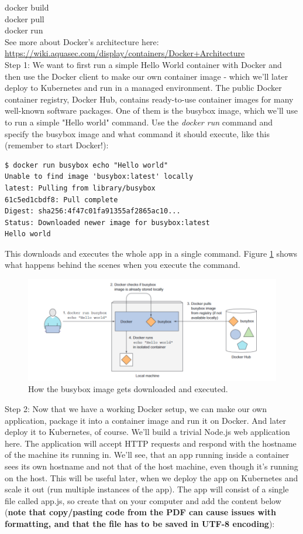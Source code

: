 \documentclass[a4paper,10pt]{article}
\begin{document}
docker build \\
docker pull \\
docker run \\

See more about Docker's architecture here: \url{https://wiki.aquasec.com/display/containers/Docker+Architecture} \\

Step 1: We want to first run a simple Hello World container with Docker and then use the Docker client to make our own container image - which we'll later deploy to Kubernetes and run in a managed environment. The public Docker container registry, Docker Hub, contains ready-to-use container images for many well-known software packages. One of them is the busybox image, which we'll use to run a simple "Hello world" command. Use the \textit{docker run} command and specify the busybox image and what command it should execute, like this (remember to start Docker!):

\begin{lstlisting}[numbers=none, basicstyle=\mdseries]
$ docker run busybox echo "Hello world"
Unable to find image 'busybox:latest' locally
latest: Pulling from library/busybox
61c5ed1cbdf8: Pull complete
Digest: sha256:4f47c01fa91355af2865ac10...
Status: Downloaded newer image for busybox:latest
Hello world
\end{lstlisting}

This downloads and executes the whole app in a single command. Figure \ref{fig:dockerhelloworld} shows what happens behind the scenes when you execute the command.\\

\begin{figure}
	\centering
	\includegraphics[width=0.8\linewidth]{docker_hello_world}
	\caption{How the busybox image gets downloaded and executed.}
	\label{fig:dockerhelloworld}
\end{figure}

Step 2: Now that we have a working Docker setup, we can make our own application, package it into a container image and run it on Docker. And later deploy it to Kubernetes, of course. We'll build a trivial Node.js web application here. The application will accept HTTP requests and respond with the hostname of the machine its running  in. We'll see, that an app running  inside a container sees its own hostname and not that of the host machine, even though it's running on the host. This will be useful later, when we deploy the app on Kubernetes and scale it out (run multiple instances of the app). The app will consist of a single file called app.js, so create that on your computer and add the content below (\textbf{note that copy/pasting code from the PDF can cause issues with formatting, and that the file has to be saved in UTF-8 encoding}):
\end{document}
